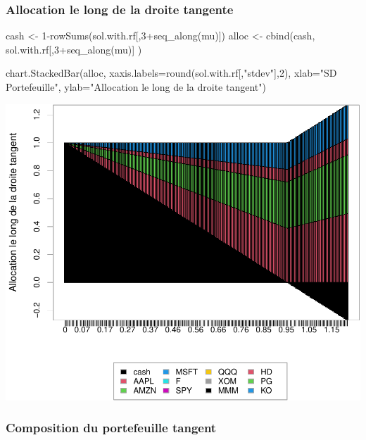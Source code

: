 \documentclass[
]{article}
\newenvironment{Shaded}{\begin{snugshade}}{\end{snugshade}}
\newcommand{\AttributeTok}[1]{\textcolor[rgb]{0.77,0.63,0.00}{#1}}
\newcommand{\DecValTok}[1]{\textcolor[rgb]{0.00,0.00,0.81}{#1}}
\newcommand{\FunctionTok}[1]{\textcolor[rgb]{0.00,0.00,0.00}{#1}}
\newcommand{\NormalTok}[1]{#1}
\newcommand{\OtherTok}[1]{\textcolor[rgb]{0.56,0.35,0.01}{#1}}
\newcommand{\SpecialCharTok}[1]{\textcolor[rgb]{0.00,0.00,0.00}{#1}}
\newcommand{\StringTok}[1]{\textcolor[rgb]{0.31,0.60,0.02}{#1}}
\begin{document}
\hypertarget{allocation-le-long-de-la-droite-tangente}{%
\subsubsection{Allocation le long de la droite
tangente}\label{allocation-le-long-de-la-droite-tangente}}

\begin{Shaded}
\begin{Highlighting}[]
\NormalTok{cash }\OtherTok{\textless{}{-}} \DecValTok{1}\SpecialCharTok{{-}}\FunctionTok{rowSums}\NormalTok{(sol.with.rf[,}\DecValTok{3}\SpecialCharTok{+}\FunctionTok{seq\_along}\NormalTok{(mu)])}
\NormalTok{alloc }\OtherTok{\textless{}{-}} \FunctionTok{cbind}\NormalTok{(cash, sol.with.rf[,}\DecValTok{3}\SpecialCharTok{+}\FunctionTok{seq\_along}\NormalTok{(mu)] )}

\FunctionTok{chart.StackedBar}\NormalTok{(alloc, }\AttributeTok{xaxis.labels=}\FunctionTok{round}\NormalTok{(sol.with.rf[,}\StringTok{"stdev"}\NormalTok{],}\DecValTok{2}\NormalTok{), }
                 \AttributeTok{xlab=}\StringTok{"SD Portefeuille"}\NormalTok{, }\AttributeTok{ylab=}\StringTok{"Allocation le long de la droite tangent"}\NormalTok{)}
\end{Highlighting}
\end{Shaded}

\includegraphics{TP-2_files/figure-latex/unnamed-chunk-9-1.pdf}

\hypertarget{composition-du-portefeuille-tangent}{%
\subsubsection{Composition du portefeuille
tangent}\label{composition-du-portefeuille-tangent}}
\end{document}
